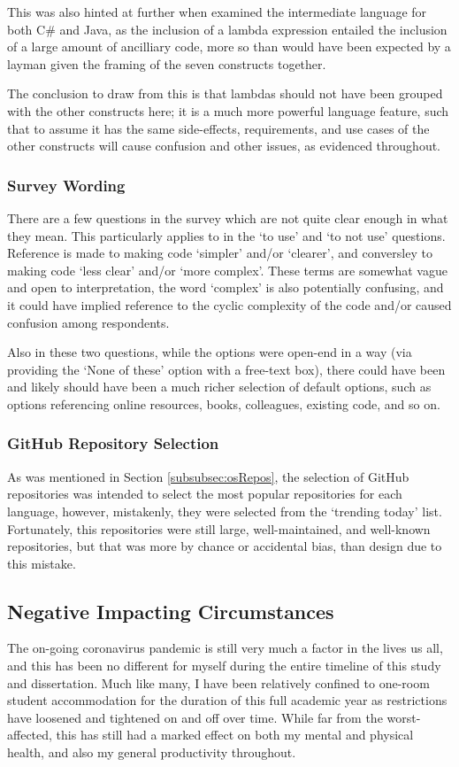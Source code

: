 \documentclass{article}
\begin{document}
            This was also hinted at further when examined the intermediate language for both C\# and Java, as the inclusion of a lambda expression entailed the inclusion of a large amount of ancilliary code, more so than would have been expected by a layman given the framing of the seven constructs together.
            
            The conclusion to draw from this is that lambdas should not have been grouped with the other constructs here; it is a much more powerful language feature, such that to assume it has the same side-effects, requirements, and use cases of the other constructs will cause confusion and other issues, as evidenced throughout.
        \subsubsection{Survey Wording}
        \label{subsubsec:surveyWording}
            There are a few questions in the survey which are not quite clear enough in what they mean. This particularly applies to in the `to use' and `to not use' questions. Reference is made to making code `simpler' and/or `clearer', and conversley to making code `less clear' and/or `more complex'. These terms are somewhat vague and open to interpretation, the word `complex' is also potentially confusing, and it could have implied reference to the cyclic complexity of the code and/or caused confusion among respondents.

            Also in these two questions, while the options were open-end in a way (via providing the `None of these' option with a free-text box), there could have been and likely should have been a much richer selection of default options, such as options referencing online resources, books, colleagues, existing code, and so on.

        \subsubsection{GitHub Repository Selection}
            As was mentioned in Section \ref{subsubsec:osRepos}, the selection of GitHub repositories was intended to select the most popular repositories for each language, however, mistakenly, they were selected from the `trending today' list. Fortunately, this repositories were still large, well-maintained, and well-known repositories, but that was more by chance or accidental bias, than design due to this mistake.
        
    \subsection{Negative Impacting Circumstances}
        The on-going coronavirus pandemic is still very much a factor in the lives us all, and this has been no different for myself during the entire timeline of this study and dissertation. Much like many, I have been relatively confined to one-room student accommodation for the duration of this full academic year as restrictions have loosened and tightened on and off over time. While far from the worst-affected, this has still had a marked effect on both my mental and physical health, and also my general productivity throughout.
\end{document}
